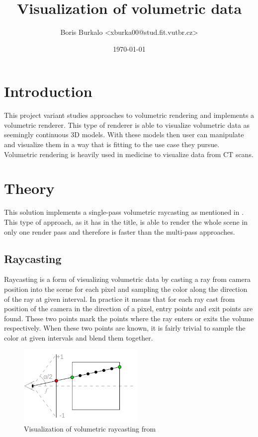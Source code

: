 \documentclass[a4paper, 12pt]{article}
\title{Visualization of volumetric data}
\author{Boris Burkalo <xburka00@stud.fit.vutbr.cz>}
\date{\today}
\begin{document}
\maketitle

\section{Introduction}
This project variant studies approaches to volumetric rendering and implements a volumetric renderer. This type of renderer is able to visualize volumetric
data as seemingly continuous 3D models. With these models then user can manipulate and visualize them in a way that is fitting to the use case
they pursue. Volumetric rendering is heavily used in medicine to visualize data from CT scans.


\section{Theory}
This solution implements a single-pass volumetric raycasting as mentioned in \cite{gpu-accelerated-rendering-article}. 
This type of approach, as it has in the title, is able to render the whole scene in only one render pass and 
therefore is faster than the multi-pass approaches.

\subsection{Raycasting}
Raycasting is a form of visualizing volumetric data by casting a ray from camera position into the scene for each pixel and sampling the color along
the direction of the ray at given interval.
In practice it means that for each ray cast from position of the camera in the direction of a pixel, entry points and exit points are found. These two points
mark the points where the ray enters or exits the volume respectively. When these two points are known, it is fairly trivial to sample the color at 
given intervals and blend them together. \\

\begin{figure}[htb]
  \centering
  \includegraphics[width=6cm,keepaspectratio]{raycasting.png}
  \caption{Visualization of volumetric raycasting from \cite{gpu-accelerated-rendering-article}}
  \label{fig:raycasting}
\end{figure}
\end{document}
